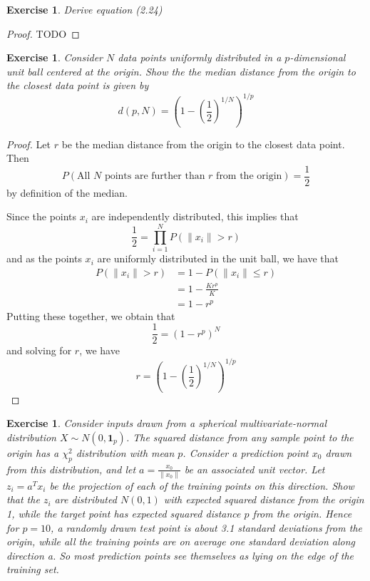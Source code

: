 \documentclass[12pt]{amsart}
\theoremstyle{plain}%
\newtheorem{exer}[thm]{Exercise}
\theoremstyle{definition}
\theoremstyle{remark}
\begin{document}
\begin{exer}
    Derive equation (2.24)
\end{exer}

\begin{proof}
    TODO
\end{proof}
    
\begin{exer}
    Consider $N$ data points uniformly distributed in a $p$-dimensional unit ball centered at the origin.  Show the the median distance from the origin to the closest data point is given by \[
        d(p, N) = \left(1-\left(\frac{1}{2}\right)^{1/N}\right)^{1/p}
    \] 
\end{exer}
\begin{proof}
    Let $r$ be the median distance from the origin to the closest data point.  Then \[
        P(\text{All $N$ points are further than $r$ from the origin}) = \frac{1}{2}
    \] by definition of the median.

    Since the points $x_i$ are independently distributed, this implies that \[
        \frac{1}{2} = \prod_{i=1}^N P(\|x_i\| > r)
    \] and as the points $x_i$ are uniformly distributed in the unit ball, we have that \begin{align*}
        P(\| x_i \| > r) &= 1 - P(\| x_i \| \leq r) \\
                         &= 1 - \frac{Kr^p}{K} \\
                         &= 1 - r^p
    \end{align*}  Putting these together, we obtain that \[
        \frac{1}{2} = \left(1-r^p \right)^{N}
    \] and solving for $r$, we have \[
        r = \left(1-\left(\frac{1}{2}\right)^{1/N}\right)^{1/p}
    \]
\end{proof}

\begin{exer}
    Consider inputs drawn from a spherical multivariate-normal distribution $X \sim N(0,\mathbf{1}_p)$. The squared distance from any sample point to the origin has a $\chi^2_p$ distribution with mean $p$. Consider a prediction point $x_0$ drawn from this distribution, and let $a = \frac{x_0}{\| x_0\|}$ be an associated unit vector. Let $z_i = a^T x_i$ be the projection of each of the training points on this direction.
    Show that the $z_i$ are distributed $N(0,1)$ with expected squared distance from the origin 1, while the target point has expected squared distance $p$ from the origin.
    Hence for $p = 10$, a randomly drawn test point is about 3.1 standard deviations from the origin, while all the training points are on average one standard deviation along direction a. So most prediction points see themselves as lying on the edge of the training set.
\end{exer}
\end{document}
